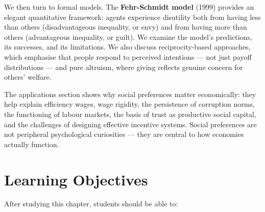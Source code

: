 \documentclass[12pt, letterpaper]{article}
\begin{document}
We then turn to formal models. The \textbf{Fehr-Schmidt model} (1999) provides an elegant quantitative framework: agents experience disutility both from having less than others (disadvantageous inequality, or envy) and from having more than others (advantageous inequality, or guilt). We examine the model's predictions, its successes, and its limitations. We also discuss reciprocity-based approaches, which emphasise that people respond to perceived intentions --- not just payoff distributions --- and pure altruism, where giving reflects genuine concern for others' welfare.

The applications section shows why social preferences matter economically: they help explain efficiency wages, wage rigidity, the persistence of corruption norms, the functioning of labour markets, the basis of trust as productive social capital, and the challenges of designing effective incentive systems. Social preferences are not peripheral psychological curiosities --- they are central to how economies actually function.

\medskip


\section*{Learning Objectives}


After studying this chapter, students should be able to:
\end{document}

